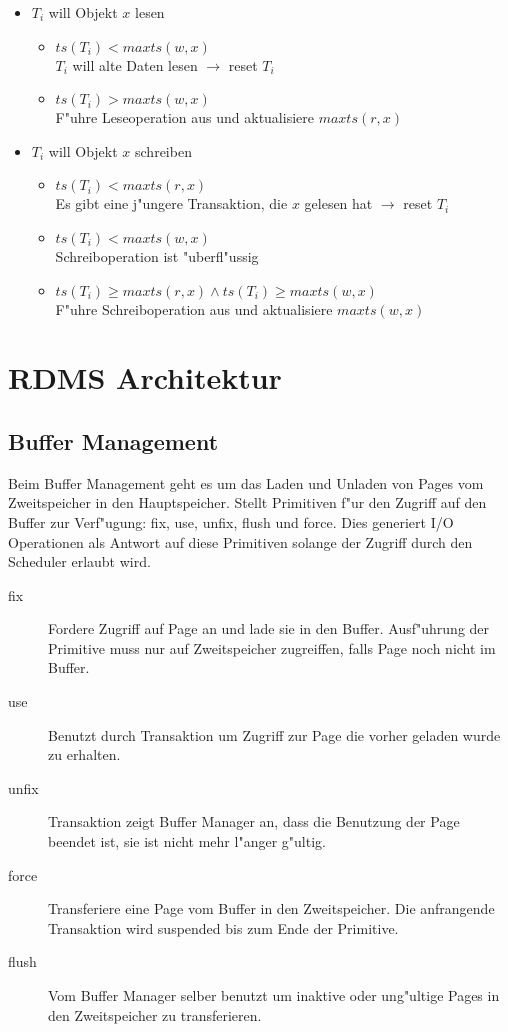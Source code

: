 \documentclass[german, 10pt, a4paper, twocolumn]{scrartcl}
\theoremstyle{definition}
\theoremstyle{remark}
\theoremstyle{example}
\begin{document}
\begin{itemize}
	\item $T_i$ will Objekt $x$ lesen
		\begin{itemize}
			\item $ts(T_i) < maxts(w,x)$\\
				$T_i$ will alte Daten lesen $\rightarrow$ reset $T_i$
			\item $ts(T_i) > maxts(w,x)$\\
				F"uhre Leseoperation aus und aktualisiere $maxts(r,x)$
		\end{itemize}
	\item $T_i$ will Objekt $x$ schreiben
		\begin{itemize}
			\item $ts(T_i) < maxts(r,x)$\\
				Es gibt eine j"ungere Transaktion, die $x$ gelesen hat $\rightarrow$ reset $T_i$
			\item $ts(T_i) < maxts(w,x)$\\
				Schreiboperation ist "uberfl"ussig
			\item $ts(T_i) \geq maxts(r,x) \land ts(T_i) \geq maxts(w,x)$\\
				F"uhre Schreiboperation aus und aktualisiere $maxts(w,x)$
		\end{itemize}
\end{itemize}

\section{RDMS Architektur}

\subsection{Buffer Management}

Beim Buffer Management geht es um das Laden und Unladen von Pages vom Zweitspeicher in den Hauptspeicher. Stellt Primitiven f"ur den Zugriff auf den Buffer zur Verf"ugung: fix, use, unfix, flush und force. Dies generiert I/O Operationen als Antwort auf diese Primitiven solange der Zugriff durch den Scheduler erlaubt wird.

\begin{description}
	\item[fix] Fordere Zugriff auf Page an und lade sie in den Buffer. Ausf"uhrung der Primitive muss nur auf Zweitspeicher zugreiffen, falls Page noch nicht im Buffer.
	\item[use] Benutzt durch Transaktion um Zugriff zur Page die vorher geladen wurde zu erhalten.
	\item[unfix] Transaktion zeigt Buffer Manager an, dass die Benutzung der Page beendet ist, sie ist nicht mehr l"anger g"ultig.
	\item[force] Transferiere eine Page vom Buffer in den Zweitspeicher. Die anfrangende Transaktion wird suspended bis zum Ende der Primitive.
	\item[flush] Vom Buffer Manager selber benutzt um inaktive oder ung"ultige Pages in den Zweitspeicher zu transferieren.
\end{description}
\end{document}
